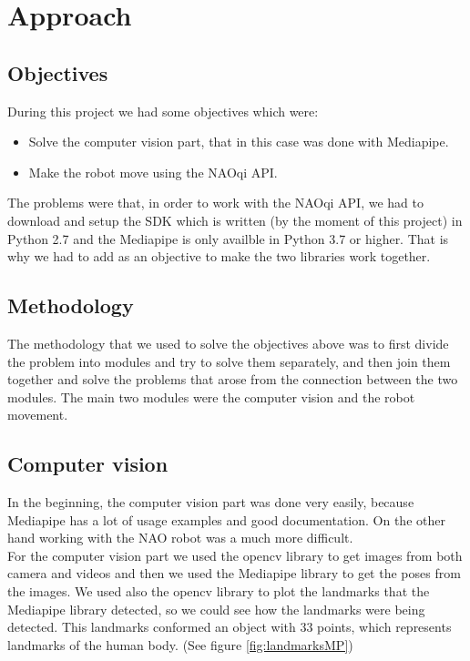 \documentclass[conference]{IEEEtran}
\begin{document}
\section{Approach}

\subsection{Objectives}

During this project we had some objectives which were:
\begin{itemize}
\item Solve the computer vision part, that in this case was done with Mediapipe.
\item Make the robot move using the NAOqi API.

\end{itemize}
The problems were that, in order to work with the NAOqi API, we had to download and setup the SDK which is written (by the moment of this project) in Python 2.7 and the Mediapipe is only availble in Python 3.7 or higher. That is why we had to add as an objective to make the two libraries work together.


\subsection{Methodology}
The methodology that we used to solve the objectives above was to first divide the problem into modules and try to solve them separately, and then join them together and solve the problems that arose from the connection between the two modules.
The main two modules were the computer vision and the robot movement.


\subsection{Computer vision}
In the beginning, the computer vision part was done very easily, because Mediapipe has a lot of usage examples and good documentation. On the other hand working with the NAO robot was a much more difficult.
\\
For the computer vision part we used the opencv library to get images from both camera and videos and then we used the Mediapipe library to get the poses from the images.
We used also the opencv library to plot the landmarks that the Mediapipe library detected, so  we could see how the landmarks were being detected. This landmarks conformed an object with 33 points, which represents landmarks of the human body. (See figure \ref{fig:landmarksMP})
\end{document}
